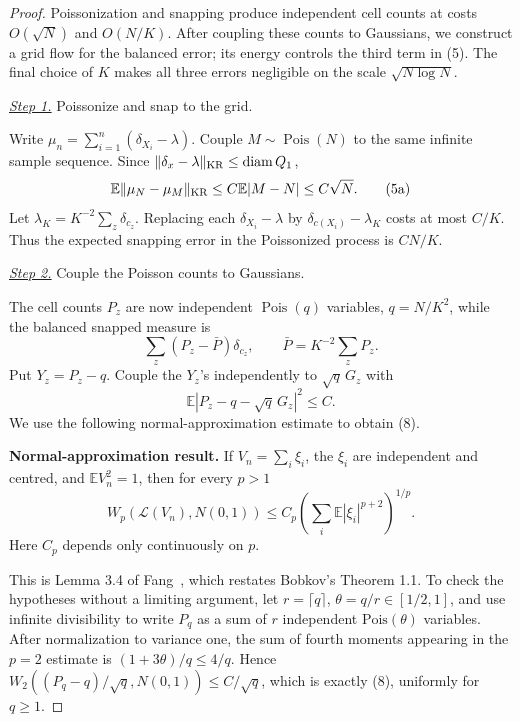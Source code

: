 \documentclass{aomart}
\theoremstyle{definition}
\newcommand{\1}{\mathbf 1}
\begin{document}
\begin{proof}
Poissonization and snapping produce independent cell counts at costs
$O(\sqrt N)$ and $O(N/K)$.  After coupling these counts to Gaussians,
we construct a grid flow for the balanced error; its energy controls the
third term in (5).  The final choice of $K$ makes all three errors
negligible on the scale $\sqrt{N\log N}$.

\smallskip\noindent
\underline{\textit{Step 1.}} Poissonize and snap to the grid.

Write $\mu_ n=\sum_ {i=1}^n(\delta_ {X_ i}-\lambda)$.  Couple
$M\sim\operatorname {Pois}(N)$ to the same infinite sample sequence.
Since $\|\delta_ x-\lambda\|_ {\rm KR}\leq\operatorname {diam}Q_ 1$,
\begin{equation}
\mathbb E\|\mu_ N-\mu_ M\|_ {\rm KR}
\leq C\mathbb E|M-N|\leq C\sqrt N.
\tag{5a}
\end{equation}
Let $\lambda_ K=K^{-2}\sum_ z\delta_ {c_ z}$.  Replacing each
$\delta_ {X_ i}-\lambda$ by
$\delta_ {c(X_ i)}-\lambda_ K$ costs at most $C/K$.  Thus the expected
snapping error in the Poissonized process is $CN/K$.

\smallskip\noindent
\underline{\textit{Step 2.}} Couple the Poisson counts to Gaussians.

The cell counts $P_ z$ are now independent
$\operatorname {Pois}(q)$ variables, $q=N/K^2$, while the balanced
snapped measure is
\begin{equation}
\sum_ z(P_ z-\bar P)\delta_ {c_ z},\qquad
\bar P=K^{-2}\sum_ zP_ z.
\tag{5b}
\end{equation}
Put $Y_ z=P_ z-q$. Couple the $Y_ z$'s independently to
$\sqrt q\,G_ z$
with
\begin{equation}
\mathbb E|P_ z-q-\sqrt q\,G_ z|^2\leq C.
\tag{8}
\end{equation}
We use the following normal-approximation estimate to obtain (8).

\textbf{Normal-approximation result.} If $V_ n=\sum_ i\xi_ i$, the $\xi_ i$
are independent and centred, and $\mathbb EV_ n^2=1$, then for every
$p>1$
\begin{equation*}
W_ p(\mathcal L(V_ n),N(0,1))
\leq C_ p\left(\sum_ i\mathbb E|\xi_ i|^{p+2}\right)^{1/p}.
\end{equation*}
Here $C_ p$ depends only continuously on $p$.

This is Lemma 3.4 of Fang~\cite{Fang2019}, which restates Bobkov's Theorem 1.1. To check the hypotheses without a limiting argument, let
$r=\lceil q\rceil$, $\theta=q/r\in[1/2,1]$, and use infinite divisibility to
write $P_ q$ as a sum of $r$ independent $\mathrm {Pois}(\theta)$
variables.  After normalization to variance one, the sum of fourth
moments appearing in the $p=2$ estimate is
$(1+3\theta)/q\leq4/q$.  Hence
$W_ 2((P_ q-q)/\sqrt q,N(0,1))\leq C/\sqrt q$, which is exactly
(8), uniformly for $q\geq1$.


\end{proof}
\end{document}
